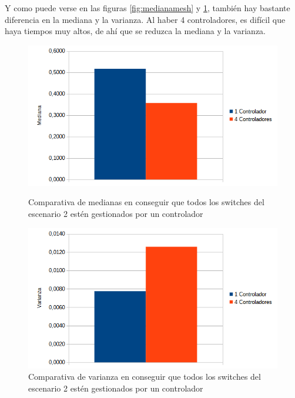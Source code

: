 \documentclass[a4paper, 12pt]{book}
\begin{document}
 	
 	Y como puede verse en las figuras \ref{fig:medianamesh} y \ref{fig:varianzamesh}, también hay bastante diferencia en la mediana y la varianza. Al haber 4 controladores, es difícil que haya tiempos muy altos, de ahí que se reduzca la mediana y la varianza.
 	

\begin{figure}[H]
	\centering
	\begin{minipage}[b]{0.45\textwidth}
		\centering
		\includegraphics[width=\textwidth]{img/comparativamedianamesh}
		\caption{Comparativa de medianas en conseguir que todos los switches del escenario 2 estén gestionados por un controlador}
		\label{fig:medianamesh}
	\end{minipage}
	\hfill
	\begin{minipage}[b]{0.45\textwidth}
		\centering
		\includegraphics[width=\textwidth]{img/comparativavarianzamesh}
		\caption{Comparativa de varianza en conseguir que todos los switches del escenario 2 estén gestionados por un controlador}
		\label{fig:varianzamesh}
	\end{minipage}
\end{figure}
 	
\end{document}
